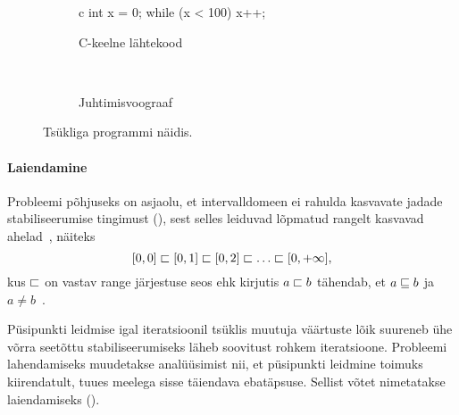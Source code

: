 \documentclass[../thesis.tex]{subfiles}
\begin{document}
\begin{figure}
	\centering
	\begin{subfigure}[b]{0.4\textwidth}
		\centering
		\begin{bminted}{c}
			int x = 0;
			while (x < 100)
				x++;
		\end{bminted}
		\caption{C-keelne lähtekood}
	\end{subfigure}
	~
	\begin{subfigure}[b]{0.4\textwidth}
		\centering
		\caption{Juhtimisvoograaf}
	\end{subfigure}

	\caption{Tsükliga programmi näidis.}
	\label{fig:prog-while}
\end{figure}

\paragraph{Laiendamine}
Probleemi põhjuseks on asjaolu, et intervalldomeen ei rahulda kasvavate jadade stabiliseerumise tingimust (), sest selles leiduvad lõpmatud rangelt kasvavad ahelad~\cite[56]{seidl_foundations}, näiteks
\[
	[0, 0] \sqsubset [0, 1] \sqsubset [0, 2] \sqsubset \ldots \sqsubset [0, +\infty],
\]
kus $\sqsubset$ on vastav range järjestuse seos ehk kirjutis $a \sqsubset b$ tähendab, et $a \sqsubseteq b$ ja $a \neq b$~\cite[3]{laan_voreteooria}.

Püsipunkti leidmise igal iteratsioonil tsüklis muutuja väärtuste lõik suureneb ühe võrra seetõttu stabiliseerumiseks läheb soovitust rohkem iteratsioone. Probleemi lahendamiseks muudetakse analüüsimist nii, et püsipunkti leidmine toimuks kiirendatult, tuues meelega sisse täiendava ebatäpsuse. Sellist võtet nimetatakse laiendamiseks ().
\end{document}
